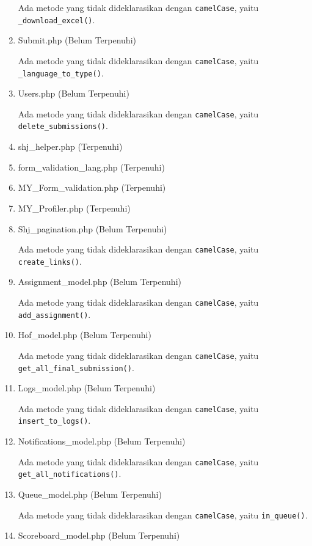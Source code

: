 \begin{enumerate}
	Ada metode yang tidak dideklarasikan dengan \texttt{camelCase}, yaitu \verb|_download_excel()|.
	\item Submit.php (Belum Terpenuhi)
	
	Ada metode yang tidak dideklarasikan dengan \texttt{camelCase}, yaitu \verb|_language_to_type()|.
	\item Users.php (Belum Terpenuhi)
	
	Ada metode yang tidak dideklarasikan dengan \texttt{camelCase}, yaitu \verb|delete_submissions()|.
	\item shj\_helper.php (Terpenuhi)
	\item form\_validation\_lang.php (Terpenuhi)
	\item MY\_Form\_validation.php (Terpenuhi)
	\item MY\_Profiler.php (Terpenuhi)
	\item Shj\_pagination.php (Belum Terpenuhi)
	
	Ada metode yang tidak dideklarasikan dengan \texttt{camelCase}, yaitu \verb|create_links()|.
	
	\item Assignment\_model.php (Belum Terpenuhi)
	
	Ada metode yang tidak dideklarasikan dengan \texttt{camelCase}, yaitu \verb|add_assignment()|. %
	
	\item Hof\_model.php (Belum Terpenuhi)
	
	Ada metode yang tidak dideklarasikan dengan \texttt{camelCase}, yaitu \verb|get_all_final_submission()|. %
	
	\item Logs\_model.php (Belum Terpenuhi)
	
	Ada metode yang tidak dideklarasikan dengan \texttt{camelCase}, yaitu \verb|insert_to_logs()|. %
	
	\item Notifications\_model.php (Belum Terpenuhi)
	
	Ada metode yang tidak dideklarasikan dengan \texttt{camelCase}, yaitu \verb|get_all_notifications()|. %
	
	\item Queue\_model.php (Belum Terpenuhi)
	
	Ada metode yang tidak dideklarasikan dengan \texttt{camelCase}, yaitu \verb|in_queue()|. %
	
	\item Scoreboard\_model.php (Belum Terpenuhi)
	

\end{enumerate}
